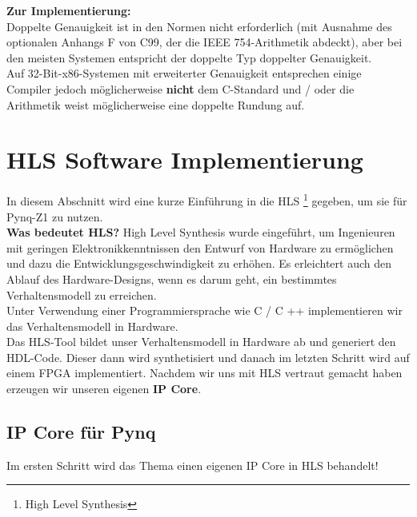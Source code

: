 \documentclass[a4paper]{report}
\begin{document}
\textbf{Zur Implementierung:}\\
Doppelte Genauigkeit ist in den Normen nicht erforderlich (mit Ausnahme des optionalen Anhangs F von C99, der die IEEE 754-Arithmetik abdeckt), aber bei den meisten Systemen entspricht der doppelte Typ doppelter Genauigkeit.\\
Auf 32-Bit-x86-Systemen mit erweiterter Genauigkeit entsprechen einige Compiler jedoch möglicherweise \textbf{nicht} dem C-Standard und / oder die Arithmetik weist möglicherweise eine doppelte Rundung auf.\\



\section{HLS Software Implementierung}
In diesem Abschnitt wird eine kurze Einführung in die HLS \footnote{High Level Synthesis} gegeben, um sie für Pynq-Z1 zu nutzen.\\
\textbf{Was bedeutet HLS?} High Level Synthesis wurde eingeführt, um Ingenieuren mit geringen Elektronikkenntnissen den Entwurf von Hardware zu ermöglichen und dazu die Entwicklungsgeschwindigkeit zu erhöhen. Es erleichtert auch den Ablauf des Hardware-Designs, wenn es darum geht, ein bestimmtes Verhaltensmodell zu erreichen.\\
 Unter Verwendung einer Programmiersprache wie C / C ++ implementieren wir das Verhaltensmodell in Hardware. \\
 Das HLS-Tool bildet unser Verhaltensmodell in Hardware ab und generiert den HDL-Code. Dieser dann wird synthetisiert und danach im letzten Schritt wird auf einem FPGA implementiert. Nachdem wir uns mit HLS vertraut gemacht haben erzeugen wir unseren eigenen \textbf{IP Core}.

\subsection{IP Core für Pynq}
Im ersten Schritt wird das Thema einen eigenen IP Core in HLS behandelt!\\
\end{document}
